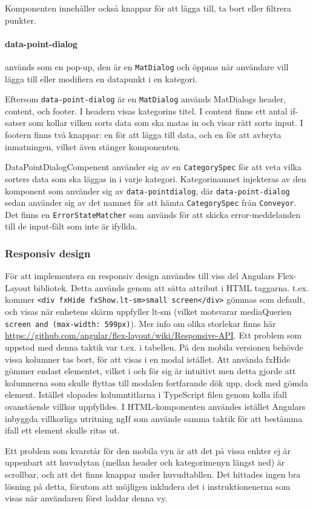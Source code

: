 \documentclass[techdoc/techdock.tex]{subfiles}
\begin{document}
Komponenten innehåller också knappar för att lägga till, ta bort eller filtrera
punkter.

\paragraph{data-point-dialog} används som en pop-up, den är en
\texttt{MatDialog} och öppnas när användare vill lägga till eller modifiera en
datapunkt i en kategori.

Eftersom \texttt{data-point-dialog} är en \texttt{MatDialog} används MatDialogs
header, content, och footer. I headern visas kategorins titel. I content finns
ett antal if-satser som kollar vilken sorts data som ska matas in och visar
rätt sorts input. I footern finns två knappar: en för att lägga till data, och
en för att avbryta inmatningen, vilket även stänger komponenten.

DataPointDialogCompenent använder sig av en \texttt{CategorySpec} för att veta
vilka sorters data som ska läggas in i varje kategori. Kategorinamnet injekteras
av den komponent som använder sig av \texttt{data-point\-dialog}, där
\texttt{data-point-dialog} sedan använder sig av det namnet för att hämta
\texttt{CategorySpec} från \texttt{Conveyor}. Det finns en
\texttt{ErrorStateMatcher} som används för att skicka error-meddelanden till de
input-fält som inte är ifyllda.

\subsubsection{Responsiv design}
För att implementera en responsiv design användes till viss del Angulars Flex-Layout
bibliotek. Detta används genom att sätta attribut i HTML taggarna. 
t.ex. kommer \texttt{<div fxHide fxShow.lt-sm>small screen</div>} gömmas som default, och visas
när enhetens skärm uppfyller lt-sm (vilket motsvarar mediaQuerien \texttt{screen and (max-width: 599px)}).
Mer info om olika storlekar finns här \url{https://github.com/angular/flex-layout/wiki/Responsive-API}.
Ett problem som uppstod med denna taktik var t.ex. i tabellen. På den mobila versionen 
behövde vissa kolumner tas bort, för att visas i en modal istället. Att använda fxHide gömmer 
endast elementet, vilket i och för sig är intuitivt men detta gjorde att kolumnerna som
skulle flyttas till modalen fortfarande dök upp, dock med gömda element. 
Istället slopades kolumntitlarna i TypeScript filen genom kolla ifall ovanstående villkor 
uppfylldes. I HTML-komponenten användes istället Angulars inbyggda villkorliga utritning
ngIf som använde samma taktik för att bestämma ifall ett element skulle ritas ut.  

Ett problem som kvarstår för den mobila vyn är att det på vissa enhter ej är uppenbart 
att huvudytan (mellan header och kategorimenyn längst ned) är scrollbar, och att det 
finns knappar under huvudtabllen. Det hittades ingen bra lösning på detta, förutom att möjligen
inkludera det i instruktionenerna som visas när användaren först laddar denna vy. 
\end{document}
